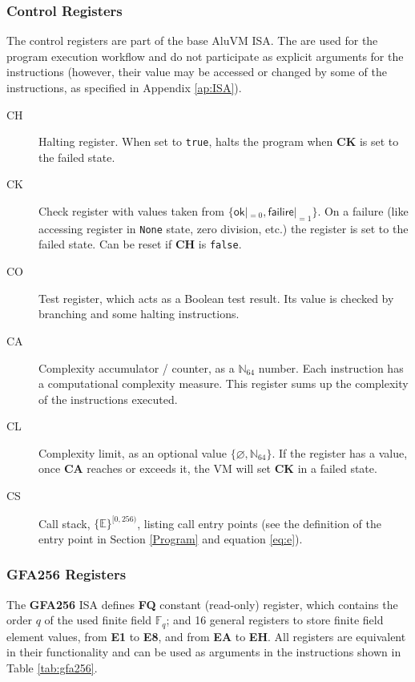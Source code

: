 \documentclass[9pt,oneside]{amsart}
\begin{document}
\begin{multicols}{2}
\subsubsection{Control Registers}\label{Registers}

The control registers are part of the base AluVM ISA.
The are used for the program execution workflow and do not participate
as explicit arguments for the instructions (however, their value may be accessed or changed
by some of the instructions, as specified in Appendix \ref{ap:ISA}).

\begin{description}
\item[CH] Halting register. When set to \texttt{true},
    halts the program when \textbf{CK} is set to the failed state.
\item[CK] Check register with values taken from $\{\mathsf{ok}|_{=0}, \mathsf{failire}|_{=1}\}$.
    On a failure (like accessing register in \texttt{None} state, zero division, etc.)
    the register is set to the failed state.
    Can be reset if \textbf{CH} is \texttt{false}.
\item[CO] Test register, which acts as a Boolean test result.
    Its value is checked by branching and some halting instructions.
\item[CA] Complexity accumulator / counter, as a $\mathbb{N}_{64}$ number.
    Each instruction has a computational complexity measure.
    This register sums up the complexity of the instructions executed.
\item[CL] Complexity limit, as an optional value $\{\varnothing, \mathbb{N}_{64}\}$.
    If the register has a value, once \textbf{CA} reaches or exceeds it,
    the VM will set \textbf{CK} in a failed state.
\item[CS] Call stack, $\{ \mathbb{E} \}^{[0, 256)}$, listing call entry points
    (see the definition of the entry point in Section \ref{Program} and equation \ref{eq:e}).
\end{description}

\subsubsection{\textbf{GFA256} Registers}

The \textbf{GFA256} ISA defines \textbf{FQ} constant (read-only) register,
which contains the order $q$ of the used finite field $\mathbb{F}_q$; and
16 general registers to store finite field element values,
from \textbf{E1} to \textbf{E8}, and from \textbf{EA} to \textbf{EH}.
All registers are equivalent in their functionality and can be used
as arguments in the instructions shown in Table \ref{tab:gfa256}.


\end{multicols}
\end{document}
